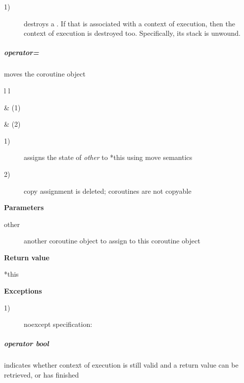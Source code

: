 \begin{description}
    \item[1)] destroys a \pullcoro. If that \pullcoro is associated with a context of execution,
              then the context of execution is destroyed too. Specifically,
              its stack is unwound.\\
\end{description}

\subparagraph*{operator=}
moves the coroutine object\\

\begin{tabular}{ l l }
    \midrule

     & (1)\\

    \midrule

     & (2)\\

    \midrule
\end{tabular}

\begin{description}
    \item[1)] assigns the state of \textit{other} to *this using move semantics
    \item[2)] copy assignment is deleted; coroutines are not copyable\\
\end{description}

{\bf Parameters}
\begin{description}
    \item[other]   another coroutine object to assign to this coroutine object\\
\end{description}

{\bf Return value}
\begin{description}
    \item[*this]
\end{description}

{\bf Exceptions}
\begin{description}
    \item[1)] noexcept specification: \\
\end{description}

\subparagraph*{operator bool}
indicates whether context of execution is still valid and a return value can be
retrieved, or \corofunction has finished\\

